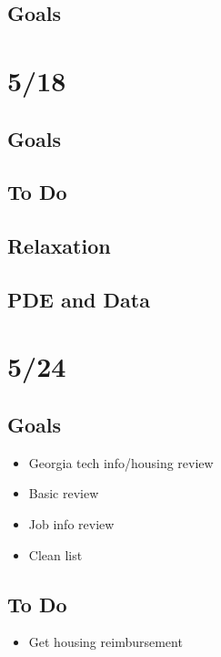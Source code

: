 \documentclass[11pt]{article}
\theoremstyle{remark}
\begin{document}
\subsection{Goals}

\section{5/18}

\subsection{Goals}

\subsection{To Do}

\subsection{Relaxation}

\subsection{PDE and Data}

\section{5/24}

\subsection{Goals}

\begin{itemize}
	\item Georgia tech info/housing review
	\item Basic review
	\item Job info review
	\item Clean list
\end{itemize}

\subsection{To Do}

\begin{itemize}
	\item Get housing reimbursement
\end{itemize}
\end{document}
